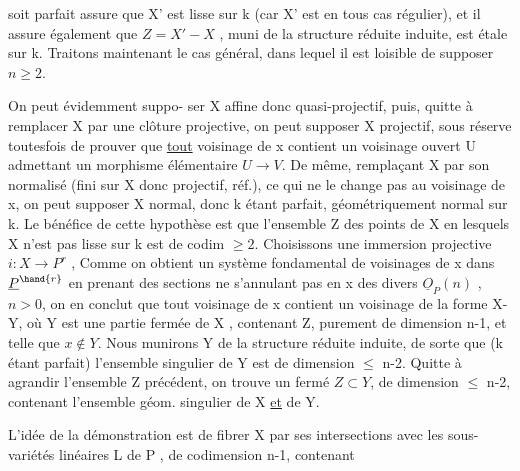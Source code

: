 
 soit parfait assure que X' est lisse sur k (car X' est en tous cas
régulier), et il assure également que $Z = X' - X$ , muni de la structure
réduite induite, est étale sur k. Traitons maintenant le cas général,
dans lequel il est loisible de supposer $n \geqslant 2$.

 On peut évidemment suppo-%
ser X  affine donc quasi-projectif, puis, quitte à remplacer X
par une clôture projective, on peut supposer X projectif, sous réserve
toutesfois de prouver que \uline{tout} voisinage de x contient un voisinage
ouvert U admettant un morphisme élémentaire $U \to V$. De même, remplaçant
X par son normalisé (fini sur X donc projectif, réf.), ce qui ne le
change pas au voisinage de x, on peut supposer X normal, donc k étant
parfait, géométriquement normal sur k.  Le
bénéfice de cette hypothèse est que l'ensemble Z des points de X en
lesquels X n'est pas lisse sur k est de codim $\geqslant 2$. 
Choisissons une immersion projective $i : X \longrightarrow P^r$ , 
 Comme on obtient un système
fondamental de voisinages de x dans $\underline{P}^{\hand{r}}$ en prenant des sections ne
s'annulant pas en x des divers $\underline{O}_P(n)$ , $n > 0$, on en conclut que tout
voisinage de x contient un voisinage de la forme X-Y, où Y est une
partie fermée de X , contenant Z, purement de dimension n-1, et telle que
$x \notin Y$. Nous munirons Y de la structure réduite induite, de sorte que
(k étant parfait) l'ensemble singulier de Y est de dimension $\leqslant$ n-2. \placedmargin{\unsure{$\nearrow$}}
Quitte à agrandir l'ensemble Z précédent, on trouve un fermé $Z \subset Y$, de
dimension $\leqslant$ n-2, contenant l'ensemble géom. singulier de X \uline{et} de Y.

L'idée de la démonstration est de fibrer X par ses intersections
avec les sous-variétés linéaires L de P , de codimension n-1, contenant

